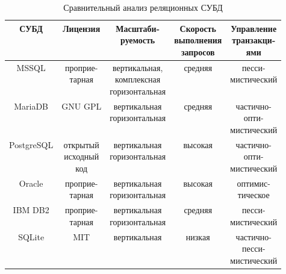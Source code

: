 \begin{table}[ht]
  \caption{Сравнительный анализ реляционных СУБД}
  \label{tab:rel-dbms}
  \begin{center}
    \begin{tabular}{|c|c|c|c|c|}
      \hline
      СУБД & Лицензия & \makecell{Масштаби- \\руемость} & \makecell{Скорость\\выполнения\\запросов} & \makecell{Управление\\транзакци-\\ями} \\
      \hline
      MSSQL \cite{mssql} & \makecell{проприе-\\тарная} & \makecell{вертикальная, \\ комплексная\\горизонтальная} & средняя & \makecell{песси-\\мистический} \\
      \hline
      MariaDB \cite{mariadb} & GNU GPL & \makecell{вертикальная\\горизонтальная} & средняя & \makecell{частично-\\опти-\\мистический} \\
      \hline
      PostgreSQL \cite{postgresql} & \makecell{открытый \\ исходный \\ код} & \makecell{вертикальная\\горизонтальная} & высокая & \makecell{частично-\\опти-\\мистический}   \\
      \hline
      Oracle \cite{oracle} & \makecell{проприе-\\тарная} & \makecell{вертикальная\\горизонтальная} & высокая & \makecell{оптимис-\\тическое} \\
      \hline
      IBM DB2 \cite{db2} & \makecell{проприе-\\тарная} & \makecell{вертикальная\\горизонтальная} & средняя & \makecell{песси-\\мистический}  \\
      \hline
      SQLite \cite{sqlite} & MIT & вертикальная & низкая & \makecell{частично-\\песси-\\мистический} \\
      \hline
    \end{tabular}
  \end{center}
\end{table}

